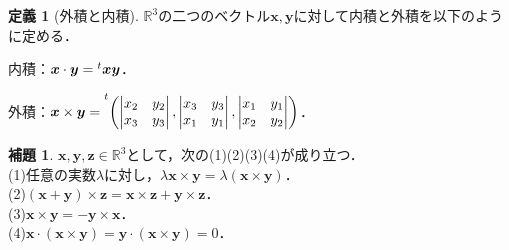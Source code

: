 \documentclass{jsarticle}
\newcommand{\transposeprescript}[1]{\prescript{t}{}{#1}}
\theoremstyle{definition}
\newtheorem{lemma}[theorem]{補題}
\newtheorem{definition}[theorem]{定義}
\numberwithin{theorem}{section}
\numberwithin{equation}{section}
\begin{document}
\begin{definition}[外積と内積]
    $\mathbb{R}^3$の二つのベクトル$\bm{x},\bm{y}$に対して内積と外積を以下のように定める．
    \par 内積：$\bm{x}\cdot\bm{y}=\transposeprescript{\bm{x}}\bm{y}$．
    \par 外積：$\bm{x}\times\bm{y}=\transposeprescript{\left( \begin{vmatrix}
        x_2&y_2\\x_3&y_3
    \end{vmatrix},\begin{vmatrix}
        x_3&y_3\\x_1&y_1
    \end{vmatrix},\begin{vmatrix}
        x_1&y_1\\x_2&y_2
    \end{vmatrix}\right)}$．
\end{definition}
\begin{lemma}$\bm{x},\bm{y},\bm{z}\in\mathbb{R}^3$として，次の(1)(2)(3)(4)が成り立つ．
\\(1)\quad 任意の実数$\lambda$に対し，$\lambda\bm{x}\times\bm{y}=\lambda(\bm{x}\times\bm{y})$．
\\(2)\quad$(\bm{x}+\bm{y})\times\bm{z}=\bm{x}\times\bm{z}+\bm{y}\times\bm{z}$．
\\(3)\quad$\bm{x}\times\bm{y}=-\bm{y}\times\bm{x}$．
\\(4)\quad$\bm{x}\cdot(\bm{x}\times\bm{y})=\bm{y}\cdot(\bm{x}\times\bm{y})=0$．
\end{lemma}
\end{document}
